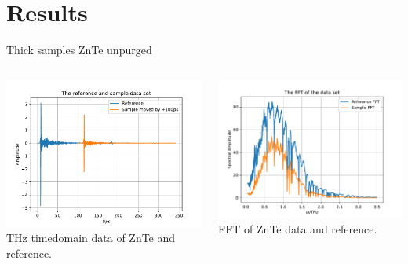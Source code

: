\documentclass[aspectratio=1610, 9pt]{beamer}
\begin{document}
\section{Results}
\begin{frame}{Thick samples}
  ZnTe unpurged
  \begin{columns}
    \begin{column}{0.5\textwidth}
      \includegraphics[width=\textwidth]{images/ZnTe1mm_purged_nofilter/THz_timedomain.pdf}
      {THz timedomain data of ZnTe and reference.}
    \end{column}
    \begin{column}{0.5\textwidth}
      \includegraphics[width=\textwidth]{images/ZnTe1mm_purged_nofilter/THz_FFT.pdf}
      {FFT of ZnTe data and reference.}
    \end{column}
  \end{columns}
\end{frame}
\end{document}
